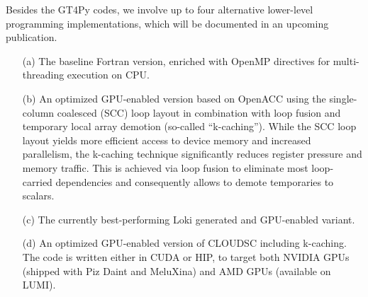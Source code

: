 \documentclass[main.tex]{subfiles}
\begin{document}
        Besides the GT4Py codes, we involve up to four alternative lower-level programming implementations, which will be documented in an upcoming publication.
        \begin{itemize}
            \item[(a)] The baseline Fortran version, enriched with OpenMP directives for multi-threading execution on CPU.
            \item[(b)] An optimized GPU-enabled version based on OpenACC using the single-column coalesced (SCC) loop layout in combination with loop fusion and temporary local array demotion (so-called ``k-caching''). While the SCC loop layout yields more efficient access to device memory and increased parallelism, the k-caching technique significantly reduces register pressure and memory traffic. This is achieved via loop fusion to eliminate most loop-carried dependencies and consequently allows to demote temporaries to scalars.
            \item[(c)] The currently best-performing Loki generated and GPU-enabled variant.
            \item[(d)] An optimized GPU-enabled version of CLOUDSC including k-caching. The code is written either in CUDA or HIP, to target both NVIDIA GPUs (shipped with Piz Daint and MeluXina) and AMD GPUs (available on LUMI).
        \end{itemize}
\end{document}
